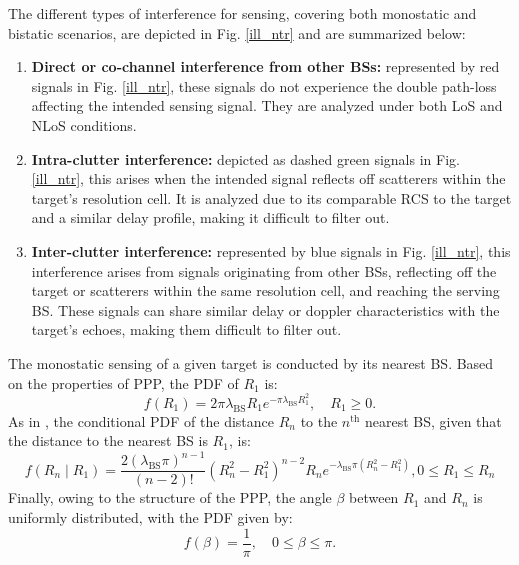 \documentclass[journal]{IEEEtran}
\begin{document}
The different types of interference for sensing, covering both monostatic and bistatic scenarios, are depicted in Fig. \ref{ill_ntr} and are summarized below:

 
\begin{enumerate}
    \item \textbf{Direct or co-channel interference from other BSs:} represented by red signals in Fig. \ref{ill_ntr}, these signals do not experience the double path-loss affecting the intended sensing signal. They are analyzed under both LoS and NLoS conditions.


    \item \textbf{Intra-clutter interference:} depicted as dashed green signals in Fig. \ref{ill_ntr}, this arises when the intended signal reflects off scatterers within the target's resolution cell. It is analyzed due to its comparable RCS to the target and a similar delay profile, making it difficult to filter out.


    \item \textbf{Inter-clutter interference:} represented by blue signals in Fig. \ref{ill_ntr}, this interference arises from signals originating from other BSs, reflecting off the target or scatterers within the same resolution cell, and reaching the serving BS. These signals can share similar delay or doppler characteristics with the target's echoes, making them difficult to filter out.
 
\end{enumerate}


The monostatic sensing of a given target is conducted by its nearest BS.  Based on the properties of PPP, the PDF of \( R_1 \) is:
\begin{equation}\label{ner_dis}
f(R_1) = 2 \pi \lambda_{\mathrm{BS}} R_1 e^{-\pi \lambda_{\mathrm{BS}} R_1^2}, \quad R_1 \geq 0.
\end{equation}
As in \cite{8057736}, the conditional PDF of the distance \( R_n \) to the \( n^{\text{th}} \) nearest BS, given that the distance to the nearest BS is \( R_1 \), is:
\footnotesize
\begin{equation}\label{cond_dstt}
f(R_n \mid R_1) = \frac{2 (\lambda_{\mathrm{BS}} \pi)^{n-1}}{(n-2)!} (R_n^2 - R_1^2)^{n-2} R_n e^{-\lambda_{\mathrm{BS}} \pi (R_n^2 - R_1^2)}, 0 \leq R_1 \leq R_n
\end{equation}
\normalsize
Finally, owing to the structure of the PPP, the angle \( \beta \) between \( R_1 \) and \( R_n \) is uniformly distributed, with the PDF given by:
\begin{equation}\label{bet_distrb}
f(\beta) = \frac{1}{\pi}, \quad 0 \leq \beta \leq \pi.
\end{equation}
\end{document}
